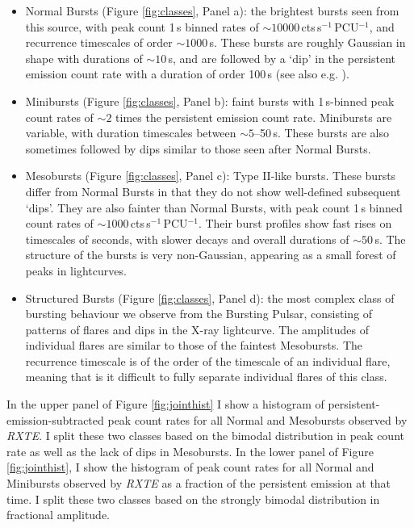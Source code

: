 \begin{itemize}
\item Normal Bursts (Figure \ref{fig:classes}, Panel a): the brightest bursts seen from this source, with peak count 1\,s binned rates of $\sim10000$\,cts\,s$^{-1}$\,PCU$^{-1}$, and recurrence timescales of order $\sim1000$\,s.  These bursts are roughly Gaussian in shape with durations of $\sim10$\,s, and are followed by a `dip' in the persistent emission count rate with a duration of order 100\,s (see also e.g. \citealp{Giles_BP}).
\item Minibursts (Figure \ref{fig:classes}, Panel b): faint bursts with 1\,s-binned peak count rates of $\sim2$ times the persistent emission count rate.  Minibursts are variable, with duration timescales between $\sim5$--50\,s.  These bursts are also sometimes followed by dips similar to those seen after Normal Bursts.
\item Mesobursts (Figure \ref{fig:classes}, Panel c): Type II-like bursts.  These bursts differ from Normal Bursts in that they do not show well-defined subsequent `dips'.  They are also fainter than Normal Bursts, with peak count 1\,s binned count rates of $\sim1000$\,cts\,s$^{-1}$\,PCU$^{-1}$.  Their burst profiles show fast rises on timescales of seconds, with slower decays and overall durations of $\sim50$\,s.  The structure of the bursts is very non-Gaussian, appearing as a small forest of peaks in lightcurves.
\item Structured Bursts (Figure \ref{fig:classes}, Panel d): the most complex class of bursting behaviour we observe from the Bursting Pulsar, consisting of patterns of flares and dips in the X-ray lightcurve.  The amplitudes of individual flares are similar to those of the faintest Mesobursts.  The recurrence timescale is of the order of the timescale of an individual flare, meaning that is it difficult to fully separate individual flares of this class.
\end{itemize}

\par In the upper panel of Figure \ref{fig:jointhist} I show a histogram of persistent-emission-subtracted peak count rates for all Normal and Mesobursts observed by \indexrxte\textit{RXTE}.  I split these two classes based on the bimodal distribution in peak count rate as well as the lack of dips in Mesobursts.  In the lower panel of Figure \ref{fig:jointhist}, I show the histogram of peak count rates for all Normal and Minibursts observed by \indexrxte\textit{RXTE} as a fraction of the persistent emission at that time.  I split these two classes based on the strongly bimodal distribution in fractional amplitude.

